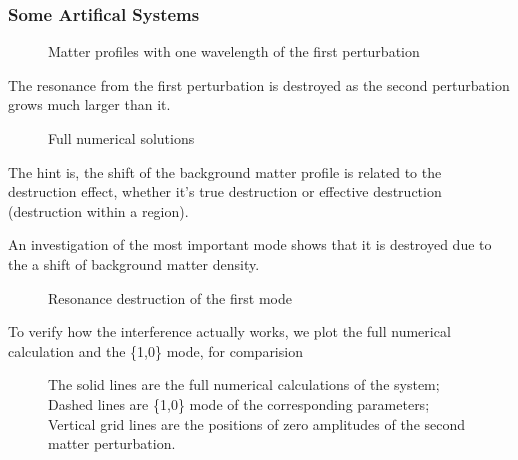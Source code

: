 \documentclass[letterpaper,12pt,english]{sphinxmanual}
\begin{document}
\subsubsection{Some Artifical Systems}
\label{\detokenize{matter-stimulated/interference:some-artifical-systems}}\begin{figure}[htbp]
\centering
\capstart

\noindent{}
\caption{Matter profiles with one wavelength of the first perturbation}\label{\detokenize{matter-stimulated/interference:id4}}\end{figure}

The resonance from the first perturbation is destroyed as the second perturbation grows much larger than it.
\begin{figure}[htbp]
\centering
\capstart

\noindent{}
\caption{Full numerical solutions}\label{\detokenize{matter-stimulated/interference:id5}}\end{figure}

The hint is, the shift of the background matter profile is related to the destruction effect, whether it's true destruction or effective destruction (destruction within a region).

An investigation of the most important mode shows that it is destroyed due to the a shift of background matter density.
\begin{figure}[htbp]
\centering
\capstart

\noindent{}
\caption{Resonance destruction of the first mode}\label{\detokenize{matter-stimulated/interference:id6}}\end{figure}

To verify how the interference actually works, we plot the full numerical calculation and the \{1,0\} mode, for comparision
\begin{figure}[htbp]
\centering
\capstart

\noindent{}
\caption{The solid lines are the full numerical calculations of the system; Dashed lines are \{1,0\} mode of the corresponding parameters; Vertical grid lines are the positions of zero amplitudes of the second matter perturbation.}\label{\detokenize{matter-stimulated/interference:second-freq-as-bg-1-d-10-1-d-1000-1-d-10000-1-d-200000-1000-full-numerical-with-10-mode-with-gridlines}}\label{\detokenize{matter-stimulated/interference:id7}}\end{figure}
\end{document}
